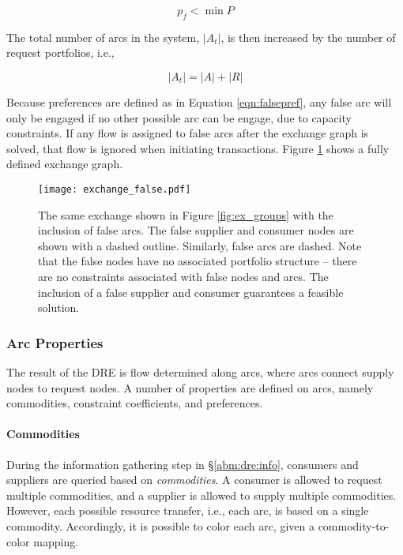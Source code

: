 \begin{equation}\label{eqn:falsepref}
  p_{f} < \min P
\end{equation}

\noindent
The total number of arcs in the system, $\left|{A_t}\right|$, is then increased
by the number of request portfolios, i.e.,

\begin{equation}
  \left|{A_t}\right| = \left|{A}\right| + \left|{R}\right|
\end{equation}

Because preferences are defined as in Equation \ref{eqn:falsepref}, any false
arc will only be engaged if no other possible arc can be engage, due to capacity
constraints. If any flow is assigned to false arcs after the exchange graph is
solved, that flow is ignored when initiating transactions. Figure
\ref{fig:ex_false} shows a fully defined exchange graph.

\begin{figure}
  \begin{center}
    \texttt{[image: exchange\_false.pdf]}
    \caption{The same exchange shown in Figure \ref{fig:ex_groups} with the
      inclusion of false arcs. The false supplier and consumer nodes are shown
      with a dashed outline. Similarly, false arcs are dashed. Note that the
      false nodes have no associated portfolio structure -- there are no
      constraints associated with false nodes and arcs. The inclusion of a false
      supplier and consumer guarantees a feasible solution.}
    \label{fig:ex_false}
  \end{center}
\end{figure}

\subsubsection{Arc Properties}\label{abm:dre:fctp:arcs}

The result of the DRE is flow determined along arcs, where arcs connect supply
nodes to request nodes. A number of properties are defined on arcs, namely
commodities, constraint coefficients, and preferences.

\paragraph{Commodities}

During the information gathering step in \S \ref{abm:dre:info}, consumers and
suppliers are queried based on \textit{commodities}. A consumer is allowed to
request multiple commodities, and a supplier is allowed to supply multiple
commodities. However, each possible resource transfer, i.e., each arc, is based
on a single commodity. Accordingly, it is possible to color each arc, given a
commodity-to-color mapping.

